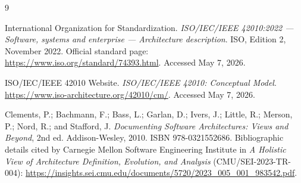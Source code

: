 \documentclass[11pt]{article}
\begin{document}
\begin{thebibliography}{9}

International Organization for Standardization.
\newblock \emph{ISO/IEC/IEEE 42010:2022 --- Software, systems and enterprise --- Architecture description}.
\newblock ISO, Edition 2, November 2022.
\newblock Official standard page: \url{https://www.iso.org/standard/74393.html}.
\newblock Accessed May 7, 2026.

ISO/IEC/IEEE 42010 Website.
\newblock \emph{ISO/IEC/IEEE 42010: Conceptual Model}.
\newblock \url{https://www.iso-architecture.org/42010/cm/}.
\newblock Accessed May 7, 2026.

Clements, P.; Bachmann, F.; Bass, L.; Garlan, D.; Ivers, J.; Little, R.; Merson, P.; Nord, R.; and Stafford, J.
\newblock \emph{Documenting Software Architectures: Views and Beyond}, 2nd ed.
\newblock Addison-Wesley, 2010. ISBN 978-0321552686.
\newblock Bibliographic details cited by Carnegie Mellon Software Engineering Institute in \emph{A Holistic View of Architecture Definition, Evolution, and Analysis} (CMU/SEI-2023-TR-004): \url{https://insights.sei.cmu.edu/documents/5720/2023_005_001_983542.pdf}.

\end{thebibliography}
\end{document}
